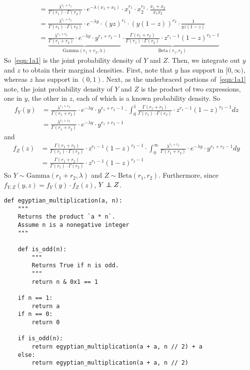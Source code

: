 \documentclass[10pt]{extarticle}
\begin{document}
\begin{ans}
\begin{align}
                       &= \frac{\lambda^{r_1 + r_2}}{\Gamma(r_1) \cdot \Gamma(r_2)} \cdot e^{-\lambda(x_1 + x_2)} \cdot x_1^{r_1} \cdot x_2^{r_2} \cdot \frac{x_1 + x_2}{x_1 x_2} \\
                       &= \frac{\lambda^{r_1 + r_2}}{\Gamma(r_1) \cdot \Gamma(r_2)} \cdot e^{-\lambda y} \cdot (yz)^{r_1} \cdot (y(1 -z))^{r_2} \cdot \frac{1}{yz(1-z)} \\
                       &= \underbrace{\frac{\lambda^{r_1 + r_2}}{\Gamma(r_1 + r_2)} \cdot e^{-\lambda y} \cdot y^{r_1 + r_2 - 1}}_{\text{Gamma}(r_1 + r_2, \lambda)} \cdot \underbrace{\frac{\Gamma(r_1 + r_2)}{\Gamma(r_1) \cdot \Gamma(r_2)} \cdot z^{r_1 - 1} (1 - z)^{r_2 - 1}}_{\text{Beta}(r_1, r_2)} \label{eqn:1a1}
    \end{align}
    So~\ref{eqn:1a1} is the joint probability density of $Y$ and $Z$. Then, we integrate out $y$ and $z$ to obtain their marginal densities. First, note that $y$ has support in $[0, \infty)$, whereas $z$ has support in $(0, 1)$. Next, as the underbraced portions of~\ref{eqn:1a1} note, the joint probability density of $Y$ and $Z$ is the product of two expressions, one in $y$, the other in $z$, each of which is a known probability density. So
    \begin{align}
        f_Y(y) &= \frac{\lambda^{r_1 + r_2}}{\Gamma(r_1 + r_2)} \cdot e^{-\lambda y} \cdot y^{r_1 + r_2 - 1} \cdot \int_0^1 \frac{\Gamma(r_1 + r_2)}{\Gamma(r_1) \cdot \Gamma(r_2)} \cdot z^{r_1 - 1} (1 - z)^{r_2 - 1} dz \\
               &= \frac{\lambda^{r_1 + r_2}}{\Gamma(r_1 + r_2)} \cdot e^{-\lambda y} \cdot y^{r_1 + r_2 - 1}
    \end{align}
    and
    \begin{align}
        f_Z(z) &= \frac{\Gamma(r_1 + r_2)}{\Gamma(r_1) \cdot \Gamma(r_2)} \cdot z^{r_1 - 1} (1 - z)^{r_2 - 1} \cdot \int_0^\infty \frac{\lambda^{r_1 + r_2}}{\Gamma(r_1 + r_2)} \cdot e^{-\lambda y} \cdot y^{r_1 + r_2 - 1} dy \\
               &= \frac{\Gamma(r_1 + r_2)}{\Gamma(r_1) \cdot \Gamma(r_2)} \cdot z^{r_1 - 1} (1 - z)^{r_2 - 1}
    \end{align}
    So $Y \sim \text{Gamma}(r_1 + r_2, \lambda)$ and $Z \sim \text{Beta}(r_1, r_2)$. Furthermore, since $f_{Y, Z}(y, z) = f_{Y}(y) \cdot f_Z(z)$, $Y \perp \!\!\!\! \perp Z$.
\end{ans}

\begin{verbatim}
def egyptian_multiplication(a, n):
    """
    Returns the product `a * n`.
    Assume n is a nonegative integer
    """

    def is_odd(n):
        """
        Returns True if n is odd.
        """
        return n & 0x1 == 1

    if n == 1:
        return a
    if n == 0:
        return 0

    if is_odd(n):
        return egyptian_multiplication(a + a, n // 2) + a
    else:
        return egyptian_multiplication(a + a, n // 2)
\end{verbatim}


\todo

\todo[message]
\end{document}
